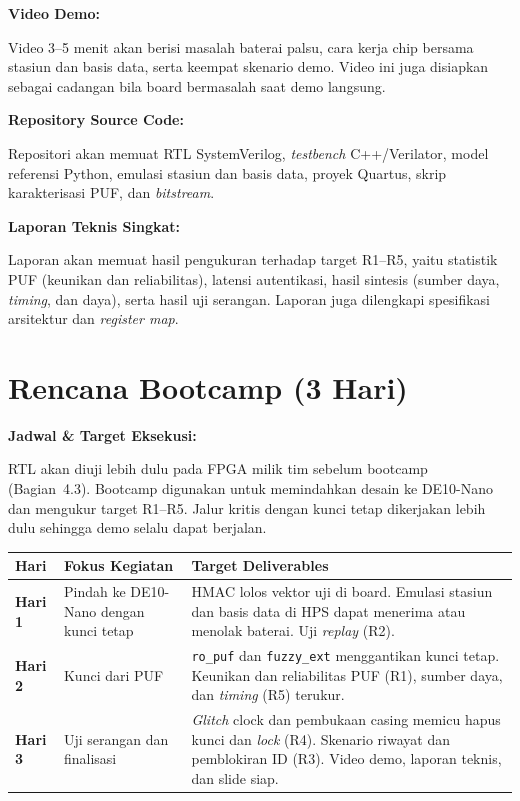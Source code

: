 \documentclass[11pt,a4paper]{article}
\newcommand{\field}[1]{\textbf{#1}\par\nobreak}
\newcommand{\hdr}[1]{\cellcolor{hdrgreen}\textbf{#1}}
\renewcommand{\arraystretch}{1.3}
\begin{document}
\field{Video Demo:}
Video 3--5 menit akan berisi masalah baterai palsu, cara kerja chip bersama stasiun dan basis data, serta keempat skenario demo. Video ini juga disiapkan sebagai cadangan bila board bermasalah saat demo langsung.

\field{Repository Source Code:}
Repositori akan memuat RTL SystemVerilog, \emph{testbench} C++/Verilator, model referensi Python, emulasi stasiun dan basis data, proyek Quartus, skrip karakterisasi PUF, dan \emph{bitstream}.

\field{Laporan Teknis Singkat:}
Laporan akan memuat hasil pengukuran terhadap target R1--R5, yaitu statistik PUF (keunikan dan reliabilitas), latensi autentikasi, hasil sintesis (sumber daya, \emph{timing}, dan daya), serta hasil uji serangan. Laporan juga dilengkapi spesifikasi arsitektur dan \emph{register map}.

\section*{Rencana Bootcamp (3 Hari)}

\field{Jadwal \& Target Eksekusi:} RTL akan diuji lebih dulu pada FPGA milik tim sebelum bootcamp (Bagian~4.3). Bootcamp digunakan untuk memindahkan desain ke DE10-Nano dan mengukur target R1--R5. Jalur kritis dengan kunci tetap dikerjakan lebih dulu sehingga demo selalu dapat berjalan.

\begin{center}
\small
\renewcommand{\arraystretch}{1.15}
\begin{tabularx}{\linewidth}{|>{\centering\arraybackslash}p{1.4cm}|>{\raggedright\arraybackslash}p{4.0cm}|X|}
\hline
\hdr{Hari} & \hdr{Fokus Kegiatan} & \hdr{Target Deliverables} \\ \hline
\textbf{Hari 1} & Pindah ke DE10-Nano dengan kunci tetap & HMAC lolos vektor uji di board. Emulasi stasiun dan basis data di HPS dapat menerima atau menolak baterai. Uji \emph{replay} (R2). \\ \hline
\textbf{Hari 2} & Kunci dari PUF & \texttt{ro\_puf} dan \texttt{fuzzy\_ext} menggantikan kunci tetap. Keunikan dan reliabilitas PUF (R1), sumber daya, dan \emph{timing} (R5) terukur. \\ \hline
\textbf{Hari 3} & Uji serangan dan finalisasi & \emph{Glitch} clock dan pembukaan casing memicu hapus kunci dan \emph{lock} (R4). Skenario riwayat dan pemblokiran ID (R3). Video demo, laporan teknis, dan slide siap. \\ \hline
\end{tabularx}
\end{center}
\end{document}
